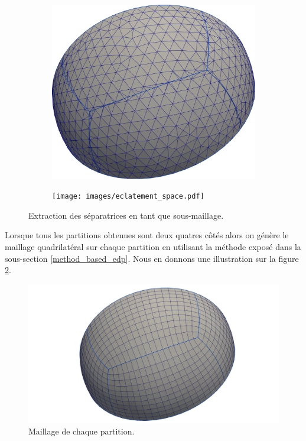 \begin{figure}[h!]
\centering
\begin{subfigure}{0.49\textwidth}
    \includegraphics[width=\textwidth]{images/split_triangles_space.pdf}
\end{subfigure}
\hfill
\begin{subfigure}{0.49\textwidth}
    \texttt{[image: images/eclatement\_space.pdf]}
\end{subfigure}
\caption{Extraction des séparatrices en tant que sous-maillage.}
\label{fig:extraction}
\end{figure}

Lorsque tous les partitions obtenues sont deux quatres côtés alors on génère le maillage quadrilatéral sur chaque partition en utilisant la méthode exposé dans la sous-section \ref{method_based_edp}. Nous en donnons une illustration sur la figure \ref{fig:quad_space}.\\

\begin{figure}[!h]
  \centering
  \includegraphics[scale=0.24]{images/quad_space.pdf}
  \caption{Maillage de chaque partition.}
  \label{fig:quad_space}
\end{figure}

